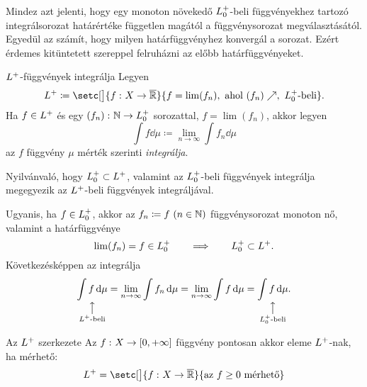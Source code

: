 \documentclass[
]{elteikthesis}[2024/04/26]
\begin{document}
	\noindent
	Mindez azt jelenti, hogy egy monoton növekedő \( \StepFuncPos \)-beli függvényekhez tartozó 
	integrálsorozat határértéke független magától a függvénysorozat megválasztásától. 
	Egyedül az számít, hogy milyen határfüggvényhez konvergál a sorozat.
	Ezért érdemes kitüntetett szereppel felruházni az előbb határfüggvényeket.
	
	\begin{definition}{\( L^+ \)-függvények integrálja}{}
		Legyen
		\[
			\StepFuncPlus \coloneq
			\setc[\big]{ \func{f}{X}{\overline{\R}} }
			     { f = \lim(f_n), \text{ ahol } (f_n) \nearrow, \ \StepFuncPos \text{-beli}}.
		\]
		Ha \( f \in L^+ \) és egy \( \func{(f_n)}{\N}{\StepFuncPos} \) sorozattal,
		\( f = \lim(f_n) \), akkor legyen
		\[
			\int f \dd{\mu} \coloneq 
			\lim_{n \to \infty} \int f_n \dd{\mu}
		\]
		az \( f \) függvény \( \mu \) mérték szerinti \emph{integrálja}.
	\end{definition}
	\newpage
	
	\begin{notes}
		\item 
		Nyilvánvaló, hogy \( \StepFuncPos \subset \StepFuncPlus \),
		valamint az \( \StepFuncPos \)-beli függvények integrálja megegyezik az 
		\( L^+ \)-beli függvények integráljával.
		
		Ugyanis, ha \( f \in \StepFuncPos \), akkor az \( f_n \coloneq f \ (n \in \mathbb{N}) \)
		függvénysorozat monoton nő, valamint a határfüggvénye
		\[
			\lim(f_n) = f \in \StepFuncPos
			\qquad \Longrightarrow \qquad
			\StepFuncPos \subset \StepFuncPlus.
		\]
		Következésképpen az integrálja
		\[
			\underset{
				\substack{
					\mathclap{\big\uparrow} \\
					\mathclap{\StepFuncPlus \text{-beli}}
				}
			}{\int f \dd{\mu}} = 
			\lim_{n \to \infty} \int f_n \dd{\mu} =
			\lim_{n \to \infty} \int f \dd{\mu} =
			\underset{
				\substack{
					\mathclap{\big\uparrow} \\
					\mathclap{\StepFuncPos \text{-beli}}
				}
			}{\int f \dd{\mu}}.
		\]
	\end{notes}
	
	\begin{theorem}{Az \( L^+ \) szerkezete}{}
		Az \( f \,\colon X \to [0, +\infty] \) függvény pontosan akkor eleme 
		\( L^+ \)-nak, 
		ha mérhető:
		\[
			\StepFuncPlus =
			\setc[\big]{ \func{f}{X}{\overline{ \R }} }{ \text{az } f \geq 0 \text{ mérhető}}
		\]
	\end{theorem}
	
\end{document}
